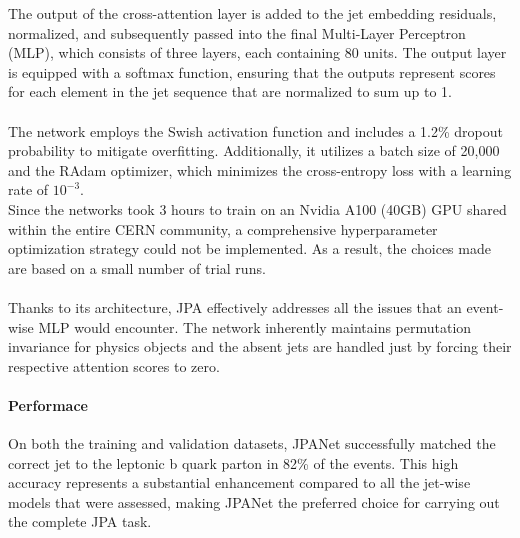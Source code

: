 \hfill
\begin{minipage}{0.65\linewidth}
The output of the cross-attention layer is added to the jet embedding residuals, normalized, and subsequently passed into the final Multi-Layer Perceptron (MLP), which consists of three layers, each containing 80 units. The output layer is equipped with a softmax function, ensuring that the outputs represent scores for each element in the jet sequence that are normalized to sum up to 1.\\
\\
The network employs the Swish activation function and includes a 1.2\% dropout probability to mitigate overfitting. Additionally, it utilizes a batch size of 20,000 and the RAdam optimizer, which minimizes the cross-entropy loss with a learning rate of $10^{-3}$.\\
Since the networks took 3 hours to train on an Nvidia A100 (40GB) GPU shared within the entire CERN community, a comprehensive hyperparameter optimization strategy could not be implemented. As a result, the choices made are based on a small number of trial runs.\\
\\
Thanks to its architecture, JPA effectively addresses all the issues that an event-wise MLP would encounter. The network inherently maintains permutation invariance for physics objects and the absent jets are handled just by forcing their respective attention scores to zero.
\end{minipage}


\paragraph*{Performace} On both the training and validation datasets, JPANet successfully matched the correct jet to the leptonic b quark parton in 82\% of the events. This high accuracy represents a substantial enhancement compared to all the jet-wise models that were assessed, making JPANet the preferred choice for carrying out the complete JPA task.





